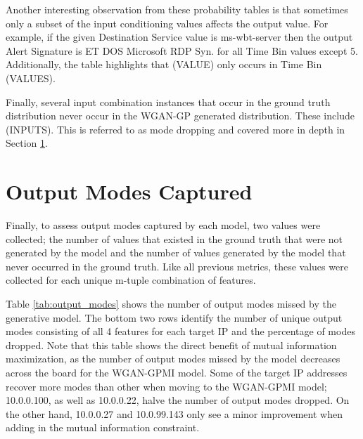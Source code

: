 Another interesting observation from these probability tables is that sometimes only a subset of the input conditioning values affects the output value. For example, if the given Destination Service value is ms-wbt-server then the output Alert Signature is ET DOS Microsoft RDP Syn. for all Time Bin values except 5. Additionally, the table highlights that (VALUE) only occurs in Time Bin (VALUES).

Finally, several input combination instances that occur in the ground truth distribution never occur in the WGAN-GP generated distribution. These include (INPUTS). This is referred to as mode dropping and covered more in depth in Section \ref{sec:output}.

\section{Output Modes Captured}
\label{sec:output}
Finally, to assess output modes captured by each model, two values were collected; the number of values that existed in the ground truth that were not generated by the model and the number of values generated by the model that never occurred in the ground truth. Like all previous metrics, these values were collected for each unique m-tuple combination of features. 

Table \ref{tab:output_modes} shows the number of output modes missed by the generative model. The bottom two rows identify the number of unique output modes consisting of all 4 features for each target IP and the percentage of modes dropped.  Note that this table shows the direct benefit of mutual information maximization, as the number of output modes missed by the model decreases across the board for the WGAN-GPMI model. Some of the target IP addresses recover more modes than other when moving to the WGAN-GPMI model; 10.0.0.100, as well as 10.0.0.22,  halve the number of output modes dropped. On the other hand, 10.0.0.27 and 10.0.99.143 only see a minor improvement when adding in the mutual information constraint. 


